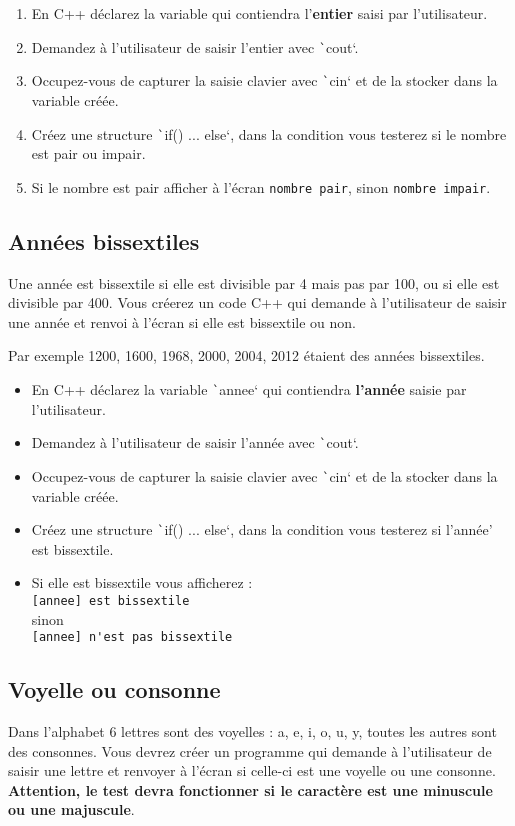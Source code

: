 \documentclass[10pt]{article}
\begin{document}
\begin{enumerate}
    \item En C++ déclarez la variable qui contiendra l'\textbf{entier} saisi par l'utilisateur.
    \item Demandez à l'utilisateur de saisir l'entier avec \texttt`cout`. 
    \item Occupez-vous de capturer la saisie clavier avec \texttt`cin` et de la stocker dans la variable créée. 
    \item Créez une structure \texttt`if() ... else`, dans la condition vous testerez si le nombre est pair ou impair.
    \item Si le nombre est pair afficher à l'écran \verb|nombre pair|, sinon \verb|nombre impair|.
\end{enumerate}


\subsection{Années bissextiles}
Une année est bissextile si elle est divisible par 4 mais pas par 100, ou si elle est divisible par 400. Vous créerez un code C++ qui demande à l'utilisateur de saisir une année et renvoi à l'écran si elle est bissextile ou non.

\smallskip
Par exemple 1200, 1600, 1968, 2000, 2004, 2012 étaient des années bissextiles.

\begin{itemize}
    \item En C++ déclarez la variable \texttt`annee` qui contiendra \textbf{l'année} saisie par l'utilisateur.
    \item Demandez à l'utilisateur de saisir l'année avec \texttt`cout`. 
    \item Occupez-vous de capturer la saisie clavier avec \texttt`cin` et de la stocker dans la variable créée.
    \item Créez une structure \texttt`if() ... else`, dans la condition vous testerez si l'année' est bissextile.
    \item Si elle est bissextile vous afficherez :\\
     \verb|[annee] est bissextile|\\
    sinon \\
    \verb|[annee] n'est pas bissextile| 
\end{itemize}


\subsection{Voyelle ou consonne}
Dans l'alphabet 6 lettres sont des voyelles : a, e, i, o, u, y, toutes les autres sont des consonnes.     
\smallskip
Vous devrez créer un programme qui demande à l'utilisateur de saisir une lettre et renvoyer à l'écran si celle-ci est une voyelle ou une consonne. \textbf{Attention, le test devra fonctionner si le caractère est une minuscule ou une majuscule}.
\end{document}
